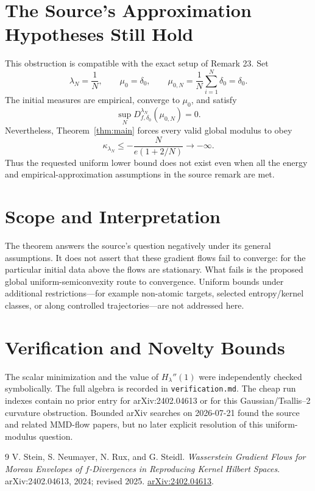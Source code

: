 \documentclass[11pt]{article}
\begin{document}
\section*{The Source's Approximation Hypotheses Still Hold}

This obstruction is compatible with the exact setup of Remark 23.  Set
\[
 \lambda_N=\frac1N,\qquad
 \mu_0=\delta_0,\qquad
 \mu_{0,N}=\frac1N\sum_{i=1}^N\delta_0=\delta_0.
\]
The initial measures are empirical, converge to $\mu_0$, and satisfy
\[
 \sup_N D_{f,\delta_0}^{\lambda_N}(\mu_{0,N})=0.
\]
Nevertheless, Theorem~\ref{thm:main} forces every valid global modulus to
obey
\[
 \kappa_{\lambda_N}\le -\frac{N}{e(1+2/N)}\longrightarrow-\infty.
\]
Thus the requested uniform lower bound does not exist even when all the
energy and empirical-approximation assumptions in the source remark are met.

\section*{Scope and Interpretation}

The theorem answers the source's question negatively under its general
assumptions.  It does not assert that these gradient flows fail to converge:
for the particular initial data above the flows are stationary.  What fails
is the proposed global uniform-semiconvexity route to convergence.  Uniform
bounds under additional restrictions---for example non-atomic targets,
selected entropy/kernel classes, or along controlled trajectories---are not
addressed here.

\section*{Verification and Novelty Bounds}

The scalar minimization and the value of $H_\lambda''(1)$ were independently
checked symbolically.  The full algebra is recorded in
\texttt{verification.md}.  The cheap run indexes contain no prior entry for
arXiv:2402.04613 or for this Gaussian/Tsallis--2 curvature obstruction.
Bounded arXiv searches on 2026-07-21 found the source and related MMD-flow
papers, but no later explicit resolution of this uniform-modulus question.

\begin{thebibliography}{9}
V. Stein, S. Neumayer, N. Rux, and G. Steidl.
\emph{Wasserstein Gradient Flows for Moreau Envelopes of $f$-Divergences in
Reproducing Kernel Hilbert Spaces}.
arXiv:2402.04613, 2024; revised 2025.
\href{https://arxiv.org/abs/2402.04613}{arXiv:2402.04613}.
\end{thebibliography}
\end{document}
